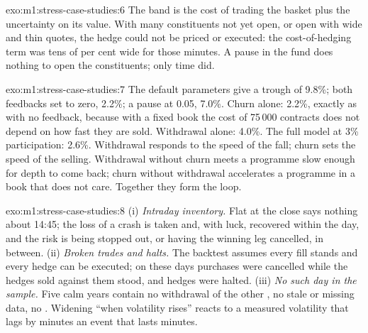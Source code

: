 \begin{solution}{exo:m1:stress-case-studies:6}
The band is the cost of trading the basket plus the uncertainty on its value.
With many constituents not yet open, or open with wide and thin quotes, the
hedge could not be priced or executed: the cost-of-hedging term was tens of
per cent wide for those minutes. A pause in the fund does nothing to open the
constituents; only time did.
\end{solution}

\begin{solution}{exo:m1:stress-case-studies:7}
The default parameters give a trough of 9.8\%; both feedbacks set to zero,
2.2\%; a pause at 0.05, 7.0\%.
Churn alone: 2.2\%, exactly as with no feedback, because with a fixed book the
cost of 75\,000 contracts does not depend on how fast they are sold.
Withdrawal alone: 4.0\%. The full model at 3\% participation: 2.6\%.
Withdrawal responds to the speed of the fall; churn sets the speed of the
selling. Withdrawal without churn meets a programme slow enough for depth to
come back; churn without withdrawal accelerates a programme in a book that
does not care. Together they form the loop.
\end{solution}

\begin{solution}{exo:m1:stress-case-studies:8}
(i) \emph{Intraday inventory.} Flat at the close says nothing about 14:45; the
loss of a crash is taken and, with luck, recovered within the day, and the
risk is being stopped out, or having the winning leg cancelled, in between.
(ii) \emph{Broken trades and halts.} The backtest assumes every fill stands
and every hedge can be executed; on these days purchases were cancelled while
the hedges sold against them stood, and hedges were halted. (iii) \emph{No such
day in the sample.} Five calm years contain no withdrawal of the other , no stale or missing data, no . Widening ``when volatility
rises'' reacts to a measured volatility that lags by minutes an event that
lasts minutes.
\end{solution}

